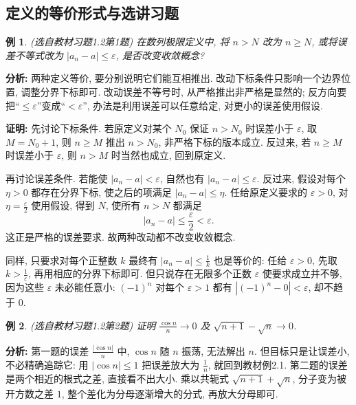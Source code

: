 \documentclass[UTF8,openany]{ctexbook}
\theoremstyle{chinesetextbook}
\newtheorem{example}{例}[section]
\newenvironment{cnproof}{\par\indent\textbf{证明:} \ignorespaces}{\par}
\begin{document}
\subsection{定义的等价形式与选讲习题}
\begin{example}
\textnormal{(选自教材习题1.2第1题)} 在数列极限定义中, 将 $n>N$ 改为 $n\ge N$, 或将误差不等式改为 $|a_n-a|\le\varepsilon$, 是否改变收敛概念?
\end{example}
\par\indent\textbf{分析:} 两种定义等价, 要分别说明它们能互相推出. 改动下标条件只影响一个边界位置, 调整分界下标即可. 改动误差不等号时, 从严格推出非严格是显然的; 反方向要把“$\le\varepsilon$”变成“$<\varepsilon$”, 办法是利用误差可以任意给定, 对更小的误差使用假设.
\begin{cnproof}
先讨论下标条件. 若原定义对某个 $N_0$ 保证 $n>N_0$ 时误差小于 $\varepsilon$, 取 $M=N_0+1$, 则 $n\ge M$ 推出 $n>N_0$, 非严格下标的版本成立. 反过来, 若 $n\ge M$ 时误差小于 $\varepsilon$, 则 $n>M$ 时当然也成立, 回到原定义.

再讨论误差条件. 若能使 $|a_n-a|<\varepsilon$, 自然也有 $|a_n-a|\le\varepsilon$. 反过来, 假设对每个 $\eta>0$ 都存在分界下标, 使之后的项满足 $|a_n-a|\le\eta$. 任给原定义要求的 $\varepsilon>0$, 对 $\displaystyle\eta=\frac\varepsilon2$ 使用假设, 得到 $N$, 使所有 $n>N$ 都满足
\[
|a_n-a|\le\frac\varepsilon2<\varepsilon.
\]
这正是严格的误差要求. 故两种改动都不改变收敛概念.
\end{cnproof}
同样, 只要求对每个正整数 $k$ 最终有 $\displaystyle|a_n-a|\le\frac1k$ 也是等价的: 任给 $\varepsilon>0$, 先取 $\displaystyle k>\frac1\varepsilon$, 再用相应的分界下标即可. 但只说存在无限多个正数 $\varepsilon$ 使要求成立并不够, 因为这些 $\varepsilon$ 未必能任意小: $(-1)^n$ 对每个 $\varepsilon>1$ 都有 $|(-1)^n-0|<\varepsilon$, 却不趋于 $0$.
\begin{example}
\textnormal{(选自教材习题1.2第2题)} 证明 $\displaystyle \frac{\cos n}{n}\to0$ 及 $\sqrt{n+1}-\sqrt n\to0$.
\end{example}
\par\indent\textbf{分析:} 第一题的误差 $\displaystyle\frac{|\cos n|}n$ 中, $\cos n$ 随 $n$ 振荡, 无法解出 $n$. 但目标只是让误差小, 不必精确追踪它: 用 $|\cos n|\le1$ 把误差放大为 $\displaystyle\frac1n$, 就回到教材例2.1. 第二题的误差是两个相近的根式之差, 直接看不出大小. 乘以共轭式 $\sqrt{n+1}+\sqrt n$, 分子变为被开方数之差 $1$, 整个差化为分母逐渐增大的分式, 再放大分母即可.
\end{document}
